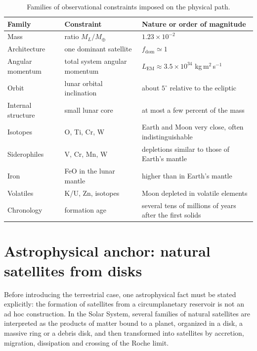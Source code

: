 \documentclass[11pt,a4paper,openany]{report}
\newcommand{\Mt}{M_{\oplus}}
\begin{document}
\begin{table}[htbp]
\centering
\small
\caption{Families of observational constraints imposed on the physical path.}
\label{tab:contraintes}
\begin{tabularx}{\textwidth}{>{\raggedright\arraybackslash}p{2.6cm}
>{\raggedright\arraybackslash}X >{\raggedright\arraybackslash}p{5.4cm}}
\toprule
\textbf{Family} & \textbf{Constraint} & \textbf{Nature or order of magnitude} \\
\midrule
Mass & ratio $M_L/\Mt$ & $1.23\times10^{-2}$ \\
Architecture & one dominant satellite & $f_{\mathrm{dom}}\simeq1$ \\
Angular momentum & total system angular momentum & $L_{\mathrm{EM}}\approx3.5\times10^{34}$ kg\,m$^2$\,s$^{-1}$ \\
Orbit & lunar orbital inclination & about $5^\circ$ relative to the ecliptic \\
Internal structure & small lunar core & at most a few percent of the mass \\
Isotopes & O, Ti, Cr, W & Earth and Moon very close, often indistinguishable \\
Siderophiles & V, Cr, Mn, W & depletions similar to those of Earth's mantle \\
Iron & FeO in the lunar mantle & higher than in Earth's mantle \\
Volatiles & K/U, Zn, isotopes & Moon depleted in volatile elements \\
Chronology & formation age & several tens of millions of years after the first solids \\
\bottomrule
\end{tabularx}
\end{table}


\section{Astrophysical anchor: natural satellites from disks}

Before introducing the terrestrial case, one astrophysical fact must be stated explicitly: the
formation of satellites from a circumplanetary reservoir is not an ad hoc construction. In the
Solar System, several families of natural satellites are interpreted as the products of matter
bound to a planet, organized in a disk, a massive ring or a debris disk, and then transformed into
satellites by accretion, migration, dissipation and crossing of the Roche limit.
\end{document}

